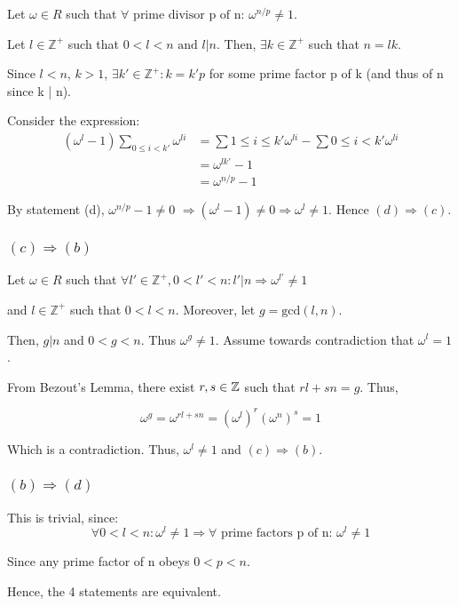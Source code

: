 Let $\omega \in R$ such that $\forall \text{ prime divisor p of n: } \omega^{n/p} \ne 1$.

Let $l \in \mathbb{Z}^+$ such that $ 0 < l < n \text{ and } l | n$. Then, $\exists k \in \mathbb{Z}^+ $ such that $n = lk$.

Since $l < n$, $k > 1$, $\exists k' \in \mathbb{Z}^+: k = k'p$ for some prime factor p of k (and thus of n since k | n). 

Consider the expression:
\begin{align*}
    (\omega^l - 1) \sum_{0 \le i < k'} \omega^{li} &= \sum{1 \le i \le k'} \omega^{li} - \sum{0 \le i < k'} \omega^{li} \\
    &= \omega^{lk'} - 1 \\
    &= \omega^{n/p} - 1
\end{align*}

By statement (d),  $\omega^{n/p} - 1 \ne 0$
$ \Rightarrow(\omega^l - 1) \ne 0 \Rightarrow \omega^l \ne 1$. Hence $(d) \Rightarrow (c)$.

\subsubsection*{$(c) \Rightarrow (b)$}

Let $\omega \in R$ such that $\forall l' \in \mathbb{Z}^+, 0 < l' < n: l' | n \Rightarrow \omega^{l'} \ne 1$ 

and $l \in \mathbb{Z}^+$ such that $ 0 < l < n$. Moreover, let $ g = \text{gcd}(l, n)$.

Then, $g | n$ and $0 < g < n$. Thus $\omega^g \ne 1$. Assume towards contradiction that $\omega^l = 1$.

From Bezout's Lemma, there exist $r,s\in \mathbb{Z}$ such that $rl + sn = g$. Thus,

\[
\omega^g = \omega^{rl + sn} = \left(\omega^l\right)^{r}\left(\omega^n\right)^{s} = 1
\]

Which is a contradiction. Thus, $\omega^l \ne 1$ and $(c) \Rightarrow (b)$.

\subsubsection*{$(b) \Rightarrow (d)$}

This is trivial, since: 
\[
\forall 0 < l < n: \omega^l \ne 1 \Rightarrow \forall \text{ prime factors p of n: } \omega^l \ne 1
\]

Since any prime factor of n obeys $0 < p < n$.

Hence, the 4 statements are equivalent.